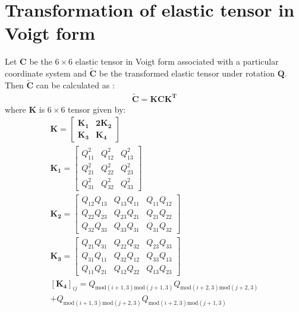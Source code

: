 \documentclass[%
reprint,
 amsmath,amssymb,
 aps,
 prb,
]{revtex4-1}
\newcommand*{\rtten}[1]{\mathbf{\boldsymbol{#1}}}
\begin{document}
\section{Transformation of elastic tensor in Voigt form}\label{app:ctrans}
Let $\rtten{C}$ be the $6\times 6$ elastic tensor in Voigt form associated with a particular coordinate system and $\rtten{\tilde{C}}$ be the transformed elastic tensor under rotation $\rtten{Q}$. Then $\rtten{\tilde{C}}$ can be calculated as \cite{ting-anis, bower2009mechanics}:
\begin{eqnarray}
\rtten{\tilde{C}}=\rtten{KCK^T}
\end{eqnarray}
where $\rtten{K}$ is $6\times 6$ tensor given by:
\iffalse
\begin{gather*}
\rtten{K}=\begin{bmatrix} \rtten{K_1} & \rtten{2K_2}\\
\rtten{K_3} & \rtten{K_4}
\end{bmatrix}\\
\rtten{K_1}=\begin{bmatrix}Q_{11}^2 & Q_{12}^2 & Q_{13}^2\\
Q_{21}^2 &  Q_{22}^2 & Q_{23}^2\\
Q_{31}^2 & Q_{32}^2 & Q_{33}^2
\end{bmatrix}\\
\rtten{K_2}=\begin{bmatrix} Q_{12}Q_{13} & Q_{13}Q_{11} & Q_{11}Q_{12}\\
Q_{22}Q_{23} & Q_{23}Q_{21} & Q_{21}Q_{22}\\
Q_{32}Q_{33} & Q_{33}Q_{31} & Q_{31}Q_{32}
\end{bmatrix}\\
\rtten{K_3}=\begin{bmatrix}Q_{21}Q_{31}& Q_{22}Q_{32}& Q_{23}Q_{33}\\
Q_{31}Q_{11} & Q_{32}Q_{12} & Q_{33}Q_{13}\\
Q_{11}Q_{21} & Q_{12}Q_{22}& Q_{13}Q_{23}
\end{bmatrix}\\
[\rtten{K_4}]_{ij}=Q_{\text{mod}(i+1,3)\text{mod}(j+1,3)}Q_{\text{mod}(i+2,3)\text{mod}(j+2,3)}\\
+Q_{\text{mod}(i+1,3)\text{mod}(j+2,3)}Q_{\text{mod}(i+2,3)\text{mod}(j+1,3)}\\
\end{gather*}
\end{document}
